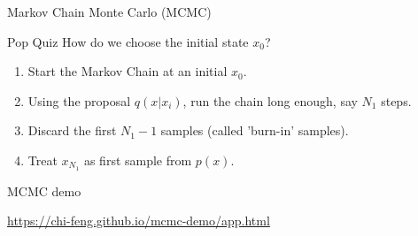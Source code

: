 \documentclass{beamer}
\begin{document}
\begin{section}{Markov Chain Monte Carlo (MCMC)}
    \begin{frame}{Pop Quiz}
        How do we choose the initial state $x_0$?
        \pause
        \begin{enumerate}
            \item Start the Markov Chain at an initial $x_0$.
            \item Using the proposal $q(x|x_i)$, run the chain long enough, say $N_1$ steps.
            \item Discard the first $N_1 - 1$ samples (called 'burn-in' samples).
            \item Treat $x_{N_1}$ as first sample from $p(x)$.
        \end{enumerate}
    \end{frame}

    \begin{frame}{MCMC demo}
        
        \url{https://chi-feng.github.io/mcmc-demo/app.html}
    \end{frame}
\end{section}
\end{document}
